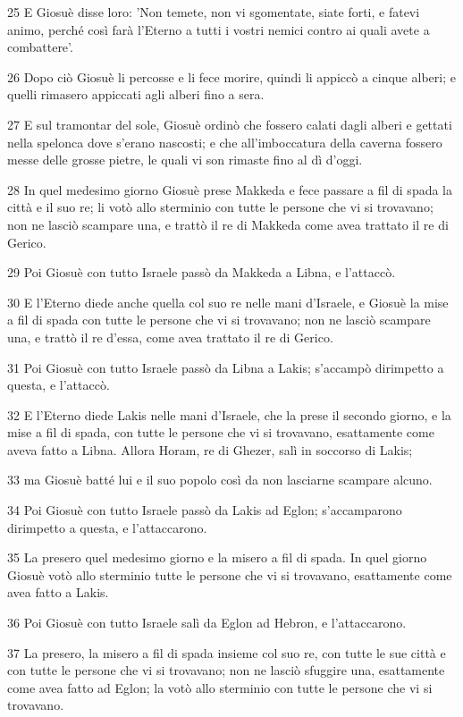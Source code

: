 \par 25 E Giosuè disse loro: 'Non temete, non vi sgomentate, siate forti, e fatevi animo, perché così farà l'Eterno a tutti i vostri nemici contro ai quali avete a combattere'.
\par 26 Dopo ciò Giosuè li percosse e li fece morire, quindi li appiccò a cinque alberi; e quelli rimasero appiccati agli alberi fino a sera.
\par 27 E sul tramontar del sole, Giosuè ordinò che fossero calati dagli alberi e gettati nella spelonca dove s'erano nascosti; e che all'imboccatura della caverna fossero messe delle grosse pietre, le quali vi son rimaste fino al dì d'oggi.
\par 28 In quel medesimo giorno Giosuè prese Makkeda e fece passare a fil di spada la città e il suo re; li votò allo sterminio con tutte le persone che vi si trovavano; non ne lasciò scampare una, e trattò il re di Makkeda come avea trattato il re di Gerico.
\par 29 Poi Giosuè con tutto Israele passò da Makkeda a Libna, e l'attaccò.
\par 30 E l'Eterno diede anche quella col suo re nelle mani d'Israele, e Giosuè la mise a fil di spada con tutte le persone che vi si trovavano; non ne lasciò scampare una, e trattò il re d'essa, come avea trattato il re di Gerico.
\par 31 Poi Giosuè con tutto Israele passò da Libna a Lakis; s'accampò dirimpetto a questa, e l'attaccò.
\par 32 E l'Eterno diede Lakis nelle mani d'Israele, che la prese il secondo giorno, e la mise a fil di spada, con tutte le persone che vi si trovavano, esattamente come aveva fatto a Libna. Allora Horam, re di Ghezer, salì in soccorso di Lakis;
\par 33 ma Giosuè batté lui e il suo popolo così da non lasciarne scampare alcuno.
\par 34 Poi Giosuè con tutto Israele passò da Lakis ad Eglon; s'accamparono dirimpetto a questa, e l'attaccarono.
\par 35 La presero quel medesimo giorno e la misero a fil di spada. In quel giorno Giosuè votò allo sterminio tutte le persone che vi si trovavano, esattamente come avea fatto a Lakis.
\par 36 Poi Giosuè con tutto Israele salì da Eglon ad Hebron, e l'attaccarono.
\par 37 La presero, la misero a fil di spada insieme col suo re, con tutte le sue città e con tutte le persone che vi si trovavano; non ne lasciò sfuggire una, esattamente come avea fatto ad Eglon; la votò allo sterminio con tutte le persone che vi si trovavano.

